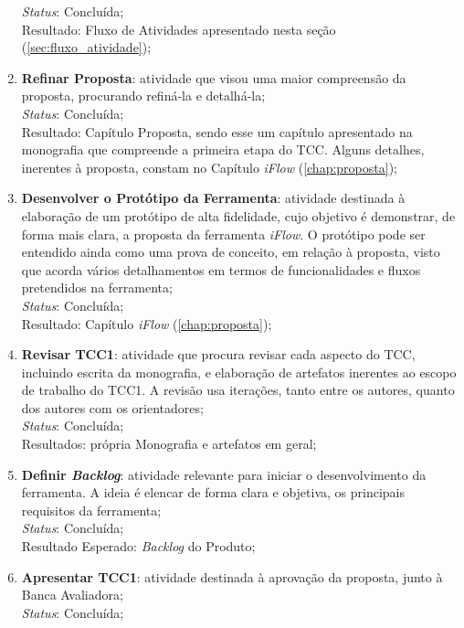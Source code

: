 \begin{enumerate}
    \textit{Status}: Concluída;
    \\
    Resultado: Fluxo de Atividades apresentado nesta seção (\ref{sec:fluxo_atividade});
    \item \textbf{Refinar Proposta}: atividade que visou uma maior compreensão da proposta, procurando refiná-la e detalhá-la;
    \\
    \textit{Status}: Concluída;
    \\
    Resultado: Capítulo Proposta, sendo esse um capítulo apresentado na monografia que compreende a primeira etapa do TCC. Alguns detalhes, inerentes à proposta, constam no Capítulo \textit{iFlow} (\ref{chap:proposta});
    \item \textbf{Desenvolver o Protótipo da Ferramenta}: atividade destinada à elaboração de um protótipo de alta fidelidade, cujo objetivo é demonstrar, de forma mais clara, a proposta da ferramenta \textit{iFlow}. O protótipo pode ser entendido ainda como uma prova de conceito, em relação à proposta, visto que acorda vários detalhamentos em termos de funcionalidades e fluxos pretendidos na ferramenta;
    \\
    \textit{Status}: Concluída;
    \\
    Resultado: Capítulo \textit{iFlow} (\ref{chap:proposta});
    \item \textbf{Revisar TCC1}: atividade que procura revisar cada aspecto do TCC, incluindo escrita da monografia, e elaboração de artefatos inerentes ao escopo de trabalho do TCC1. A revisão usa iterações, tanto entre os autores, quanto dos autores com os orientadores;
    \\
    \textit{Status}: Concluída;
    \\
    Resultados: própria Monografia e artefatos em geral;
    
    \item \label{item:def_backlog} \textbf{Definir \textit{Backlog}}: atividade relevante para iniciar o desenvolvimento da ferramenta. A ideia é elencar de forma clara e objetiva, os principais requisitos da ferramenta;
    \\
    \textit{Status}: Concluída;
    \\
    Resultado Esperado: \textit{Backlog} do Produto;
    
    \item \label{item:revision} \textbf{Apresentar TCC1}: atividade destinada à aprovação da proposta, junto à Banca Avaliadora;
    \\
    \textit{Status}: Concluída;
    

\end{enumerate}
